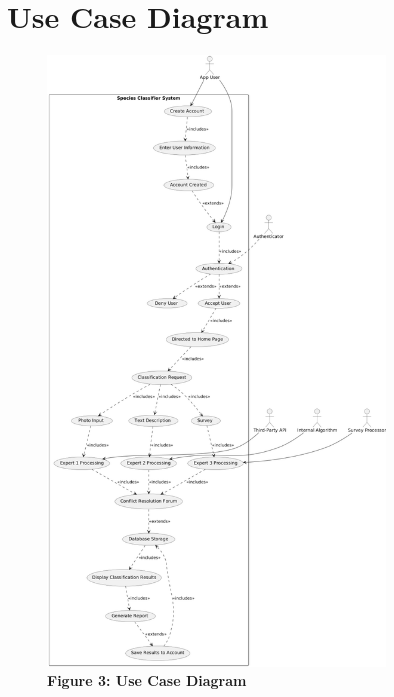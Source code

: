 \documentclass[]{article}
\begin{document}
\section{Use Case Diagram}
\begin{figure}[H]
    \centering
    \includegraphics[width=0.8\textwidth, height=1.15\textwidth]{3Diagram.png}
    \caption*{\textbf{Figure 3: Use Case Diagram}}
\end{figure}

\end{document}
